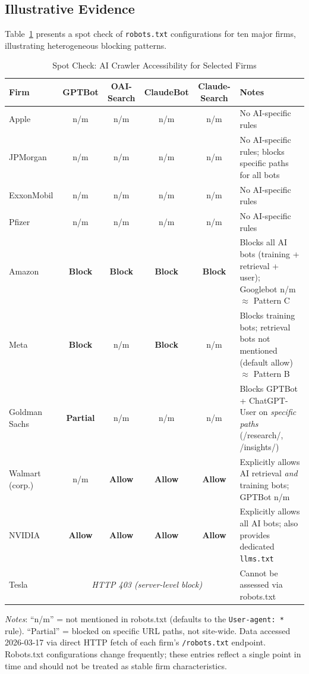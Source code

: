 \documentclass[12pt,a4paper]{article}
\begin{document}
\subsection{Illustrative Evidence}

Table~\ref{tab:spot_check} presents a spot check of \texttt{robots.txt} configurations for ten major firms, illustrating heterogeneous blocking patterns.

\begin{table}[htbp]
\centering
\caption{Spot Check: AI Crawler Accessibility for Selected Firms}
\label{tab:spot_check}
\small
\begin{tabularx}{\textwidth}{lccccX}
\toprule
\textbf{Firm} & \textbf{GPTBot} & \textbf{OAI-Search} & \textbf{ClaudeBot} & \textbf{Claude-Search} & \textbf{Notes} \\
\midrule
Apple       & n/m & n/m & n/m & n/m & No AI-specific rules \\
\addlinespace
JPMorgan    & n/m & n/m & n/m & n/m & No AI-specific rules; blocks specific paths for all bots \\
\addlinespace
ExxonMobil  & n/m & n/m & n/m & n/m & No AI-specific rules \\
\addlinespace
Pfizer      & n/m & n/m & n/m & n/m & No AI-specific rules \\
\addlinespace
Amazon      & \textbf{Block} & \textbf{Block} & \textbf{Block} & \textbf{Block} & Blocks all AI bots (training + retrieval + user); Googlebot n/m $\approx$ Pattern C \\
\addlinespace
Meta        & \textbf{Block} & n/m & \textbf{Block} & n/m & Blocks training bots; retrieval bots not mentioned (default allow) $\approx$ Pattern B \\
\addlinespace
Goldman Sachs & \textbf{Partial} & n/m & n/m & n/m & Blocks GPTBot + ChatGPT-User on \emph{specific paths} (/research/, /insights/) \\
\addlinespace
Walmart (corp.) & n/m & \textbf{Allow} & \textbf{Allow} & \textbf{Allow} & Explicitly allows AI retrieval \emph{and} training bots; GPTBot n/m \\
\addlinespace
NVIDIA      & \textbf{Allow} & \textbf{Allow} & \textbf{Allow} & \textbf{Allow} & Explicitly allows all AI bots; also provides dedicated \texttt{llms.txt} \\
\addlinespace
Tesla       & \multicolumn{4}{c}{\textit{HTTP 403 (server-level block)}} & Cannot be assessed via robots.txt \\
\bottomrule
\end{tabularx}

\medskip
\noindent\textit{Notes}: ``n/m'' = not mentioned in robots.txt (defaults to the \texttt{User-agent: *} rule). ``Partial'' = blocked on specific URL paths, not site-wide. Data accessed 2026-03-17 via direct HTTP fetch of each firm's \texttt{/robots.txt} endpoint. Robots.txt configurations change frequently; these entries reflect a single point in time and should not be treated as stable firm characteristics.
\end{table}
\end{document}
